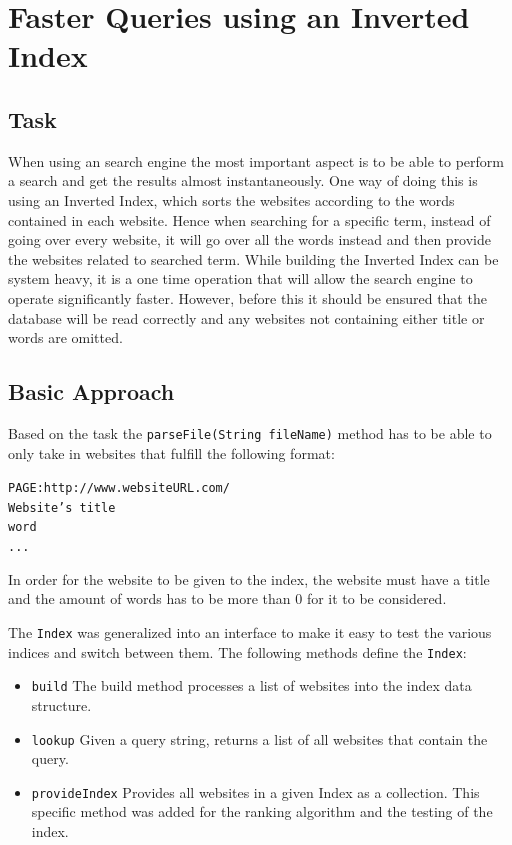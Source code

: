 \chapter{Faster Queries using an Inverted Index}


\section{Task}
When using an search engine the most important aspect is to be able to perform a search and get the results almost instantaneously. One way of doing this is using an Inverted Index, which sorts the websites according to the words contained in each website. Hence when searching for a specific term, instead of going over every website, it will go over all the words instead and then provide the websites related to searched term. While building the Inverted Index can be system heavy, it is a one time operation that will allow the search engine to operate significantly faster. However, before this it should be ensured that the database will be read correctly and any websites not containing either title or words are omitted.

\section{Basic Approach}
Based on the task the {\tt parseFile(String fileName)} method has to be able to only take in websites that fulfill the following format:

{\tt *PAGE:http://www.websiteURL.com/} \\
{\tt Website's title} \\
{\tt word} \\
{\tt ...}

In order for the website to be given to the index, the website must have a title and the amount of words has to be more than 0 for it to be considered.

The {\tt Index} was generalized into an interface to make it easy to test the various indices and switch between them. The following methods define the {\tt Index}:
\begin{itemize}
    \item {\tt build} The build method processes a list of websites into the index data structure.
    \item {\tt lookup} Given a query string, returns a list of all websites that contain the query.
    \item {\tt provideIndex} Provides all websites in a given Index as a collection. This specific method was added for the ranking algorithm and the testing of the index.
\end{itemize}

